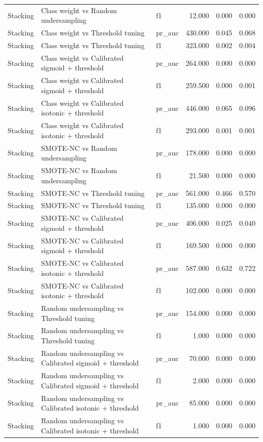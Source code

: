 \begin{tabular}{lllrrr}
Stacking & Class weight vs Random undersampling & f1 & 12.000 & 0.000 & 0.000 \\
Stacking & Class weight vs Threshold tuning & pr_auc & 430.000 & 0.045 & 0.068 \\
Stacking & Class weight vs Threshold tuning & f1 & 323.000 & 0.002 & 0.004 \\
Stacking & Class weight vs Calibrated sigmoid + threshold & pr_auc & 264.000 & 0.000 & 0.000 \\
Stacking & Class weight vs Calibrated sigmoid + threshold & f1 & 259.500 & 0.000 & 0.001 \\
Stacking & Class weight vs Calibrated isotonic + threshold & pr_auc & 446.000 & 0.065 & 0.096 \\
Stacking & Class weight vs Calibrated isotonic + threshold & f1 & 293.000 & 0.001 & 0.001 \\
Stacking & SMOTE-NC vs Random undersampling & pr_auc & 178.000 & 0.000 & 0.000 \\
Stacking & SMOTE-NC vs Random undersampling & f1 & 21.500 & 0.000 & 0.000 \\
Stacking & SMOTE-NC vs Threshold tuning & pr_auc & 561.000 & 0.466 & 0.570 \\
Stacking & SMOTE-NC vs Threshold tuning & f1 & 135.000 & 0.000 & 0.000 \\
Stacking & SMOTE-NC vs Calibrated sigmoid + threshold & pr_auc & 406.000 & 0.025 & 0.040 \\
Stacking & SMOTE-NC vs Calibrated sigmoid + threshold & f1 & 169.500 & 0.000 & 0.000 \\
Stacking & SMOTE-NC vs Calibrated isotonic + threshold & pr_auc & 587.000 & 0.632 & 0.722 \\
Stacking & SMOTE-NC vs Calibrated isotonic + threshold & f1 & 102.000 & 0.000 & 0.000 \\
Stacking & Random undersampling vs Threshold tuning & pr_auc & 154.000 & 0.000 & 0.000 \\
Stacking & Random undersampling vs Threshold tuning & f1 & 1.000 & 0.000 & 0.000 \\
Stacking & Random undersampling vs Calibrated sigmoid + threshold & pr_auc & 70.000 & 0.000 & 0.000 \\
Stacking & Random undersampling vs Calibrated sigmoid + threshold & f1 & 2.000 & 0.000 & 0.000 \\
Stacking & Random undersampling vs Calibrated isotonic + threshold & pr_auc & 85.000 & 0.000 & 0.000 \\
Stacking & Random undersampling vs Calibrated isotonic + threshold & f1 & 1.000 & 0.000 & 0.000 \\

\end{tabular}
